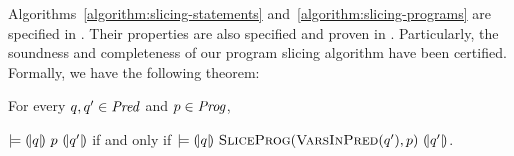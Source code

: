 Algorithms~\ref{algorithm:slicing-statements}
and~\ref{algorithm:slicing-programs} are specified in \gallina. Their
properties are 
also specified and proven in \coq. Particularly, the
soundness and completeness of our program slicing algorithm have been
certified. Formally, we have the following theorem:

\begin{theorem}
  For every $q, q' \in \mathit{Pred}$ and $p \in \mathit{Prog}$,
  \begin{center}
  $\models {(\!|}{q}{|\!)}~{p}~{(\!|}{q'}{|\!)}$ if and only if
  $\models {(\!|}{q}{|\!)}~{\textsc{SliceProg}(\textsc{VarsInPred}(q'), p)}~{(\!|}{q'}{|\!)}$.
  \end{center}
  \label{theorem:program-slicing}
\end{theorem}